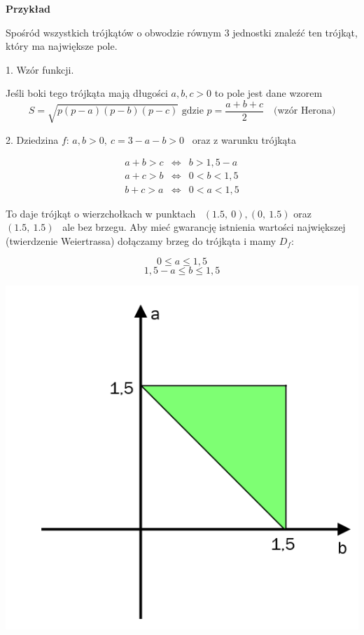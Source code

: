 \textbf{Przykład}

Spośród wszystkich trójkątów o obwodzie równym $3$ jednostki znaleźć ten trójkąt, który ma największe pole.
\medskip

1. Wzór funkcji.

Jeśli boki tego trójkąta mają długości $a,b,c > 0$ to pole jest dane wzorem
\[ S = \sqrt{p(p-a)(p-b)(p-c)} \textrm{ \ gdzie \ } p = \frac{a+b+c}{2} \quad \textrm{(wzór Herona)} \]
\medskip

2. Dziedzina $f$: $ a,b > 0, \ c = 3 - a - b > 0 $ \ oraz z warunku trójkąta

\[ \begin{array}{ccc} 
    a+b>c & \Leftrightarrow & b > 1,5 - a \\
    a+c>b & \Leftrightarrow & 0 < b < 1,5 \\
    b+c>a & \Leftrightarrow & 0 < a < 1,5
\end{array} \]

To daje trójkąt o wierzchołkach w punktach \ $(1.5, \ 0), (0, \ 1.5)$ oraz $(1.5, \ 1.5)$ \ ale bez brzegu.
Aby mieć gwarancję istnienia wartości największej (twierdzenie Weiertrassa) dołączamy brzeg do trójkąta i mamy $D_f$:

\[ 0 \leq a \leq 1,5 \]
\[ 1,5 - a \leq b \leq 1,5 \]

\begin{center}
    \includegraphics[scale=0.5]{img/trojkat.png}
\end{center}
\bigskip

